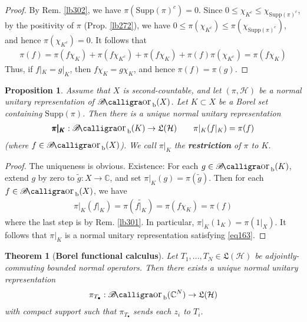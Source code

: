 \documentclass[12pt,b5paper,notitlepage]{article}
\theoremstyle{definition}
\theoremstyle{plain}
\newtheorem{thm}[df]{Theorem}
\newtheorem{pp}[df]{Proposition}
\DeclareMathOperator{\Borb}{{\mathscr{B}\text{\kern -2pt {\calligra\large or}}\,}_{\mathrm b}}
\newcommand{\fk}{\mathfrak}
\newcommand{\wtd}{\widetilde}
\newcommand{\blt}{\bullet}
\newcommand{\Cbb}{\mathbb C}
\newcommand{\Supp}{\mathrm{Supp}}
\newcommand{\MH}{\mathcal H}
\numberwithin{equation}{section}
\begin{document}
\begin{proof}
By Rem. \ref{lb302}, we have $\pi(\Supp(\pi)^c)=0$. Since $0\leq \chi_{K^c}\leq\chi_{\Supp(\pi)^c}$, by the positivity of $\pi$ (Prop. \ref{lb272}), we have $0\leq \pi(\chi_{K^c})\leq\pi(\chi_{\Supp(\pi)^c})$, and hence $\pi(\chi_{K^c})=0$. It follows that
\begin{align*}
\pi(f)=\pi(f\chi_K)+\pi(f\chi_{K^c})+\pi(f\chi_K)+\pi(f)\pi(\chi_{K^c})=\pi(f\chi_K)
\end{align*}
Thus, if $f|_K=g|_K$, then $f\chi_K=g\chi_K$, and hence $\pi(f)=\pi(g)$.
\end{proof}

\begin{pp}\label{lb303}
Assume that $X$ is second-countable, and let $(\pi,\MH)$ be a normal unitary representation of $\Borb(X)$. Let $K\subset X$ be a Borel set containing $\Supp(\pi)$. Then there is a unique normal unitary representation
\begin{gather}\label{eq163}
\pmb{\pi|_K}:\Borb(K)\rightarrow\fk L(\MH)\qquad \pi|_K(f|_K)=\pi(f)
\end{gather}
(where $f\in\Borb(X)$). We call $\pi|_K$ the \textbf{restriction}  of $\pi$ to $K$.
\end{pp}

\begin{proof}
The uniqueness is obvious. Existence: For each $g\in\Borb(K)$, extend $g$ by zero to $\wtd g:X\rightarrow\Cbb$, and set $\pi|_K(g)=\pi(\wtd g)$. Then for each $f\in\Borb(X)$, we have
\begin{align*}
\pi|_K(f|_K)=\pi(\wtd{f|_K})=\pi(f\chi_K)=\pi(f)
\end{align*}
where the last step is by Rem. \ref{lb301}. In particular, $\pi|_K(1_K)=\pi(1|_X)$. It follows that $\pi|_K$ is a normal unitary representation satisfying \eqref{eq163}.
\end{proof}




\begin{thm}[\textbf{Borel functional calculus}]\label{lb331}
Let $T_1,\dots,T_N\in\fk L(\MH)$ be adjointly-commuting bounded normal operators. Then there exists a unique normal unitary representation
\begin{align*}
\pi_{T_\blt}:\Borb(\Cbb^N)\rightarrow\fk L(\MH)
\end{align*}
with compact support such that $\pi_{T_\blt}$ sends each $z_i$ to $T_i$.
\end{thm}
\end{document}
